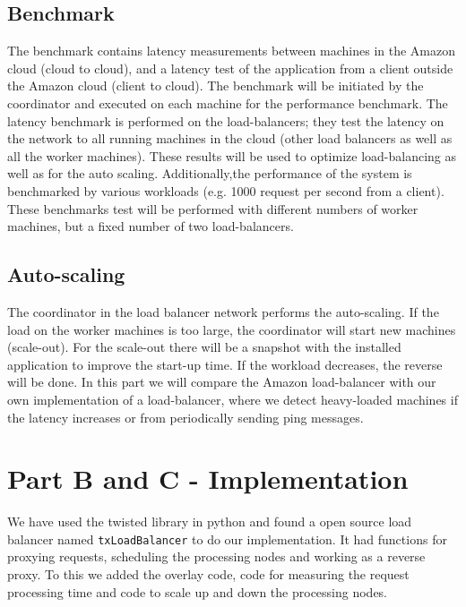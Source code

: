 \documentclass[paper=a4, fontsize=11pt]{scrartcl} %
\numberwithin{equation}{section} %
\numberwithin{figure}{section} %
\numberwithin{table}{section} %
\begin{document}
\subsection{Benchmark}

The benchmark contains latency measurements between machines in the Amazon cloud (cloud to cloud), and a latency test of the application from a client outside the Amazon cloud (client to cloud). The benchmark will be initiated by the coordinator and executed on each machine for the performance benchmark. The latency benchmark is performed on the load-balancers; they test the latency on the network to all running machines in the cloud (other load balancers as well as all the worker machines). These results will be used to optimize load-balancing as well as for the auto scaling.
Additionally,the performance of the system is benchmarked by various workloads (e.g. 1000 request per second from a client). These benchmarks test will be performed with different numbers of worker machines, but a fixed number of two load-balancers.

\subsection{Auto-scaling}

The coordinator in the load balancer network performs the auto-scaling. If the load on the worker machines is too large, the coordinator will start new machines (scale-out). For the scale-out there will be a snapshot with the installed application to improve the start-up time. 
If the workload decreases, the reverse will be done.
In this part we will compare the Amazon load-balancer with our own implementation of a load-balancer, where we detect heavy-loaded machines if the latency increases or from periodically sending ping messages.

\section{Part B and C - Implementation}

We have used the twisted library in python and found a open source load balancer named \verb|txLoadBalancer| to do our implementation. It had functions for proxying requests, scheduling the processing nodes and working as a reverse proxy. To this we added the overlay code, code for measuring the request processing time and code to scale up and down the processing nodes.
\end{document}
